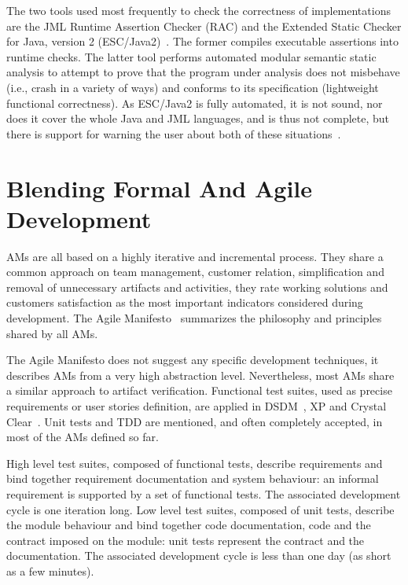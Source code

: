 \documentclass{article}
\begin{document}
The two tools used most frequently to check the correctness of implementations are the JML Runtime Assertion Checker (RAC) and the
Extended Static Checker for Java, version 2 (ESC/Java2)~\cite{Cheon-Leavens02b,BurdyEtal05-STTT,KiniryCok04}.  
The former compiles executable assertions into runtime checks.  
The latter tool performs automated modular semantic static analysis to attempt to prove that the program under analysis does not misbehave (i.e., crash in a variety of ways) and conforms to its specification (lightweight functional correctness).  
As ESC/Java2 is fully automated, it is not sound, nor does it cover the whole Java and JML languages, and is thus not complete, but there is support for warning the user about both of these situations~\cite{KiniryEtal06}.



\section{Blending Formal And Agile Development}
\label{sec:blending_formal_and_agile_development}

AMs are all based on a highly iterative and incremental process.
They share a common approach on team management, customer relation, simplification and removal of unnecessary artifacts and activities, they rate working solutions and customers satisfaction as the most important indicators considered during development.
The Agile Manifesto~\cite{Beck2001} summarizes the philosophy and principles shared by all AMs.

The Agile Manifesto does not suggest any specific development techniques, it describes AMs from a very high abstraction level.
Nevertheless, most AMs share a similar approach to artifact verification.
Functional test suites, used as precise requirements or user stories definition, are applied in DSDM~\cite{Stapleton1997}, XP and Crystal Clear~\cite{Cockburn2004}. 
Unit tests and TDD are mentioned, and often completely accepted, in most of the AMs defined so far.

High level test suites, composed of functional tests, describe requirements and bind together requirement documentation and system behaviour: an informal requirement is supported by a set of functional tests. 
The associated development cycle is one iteration long. 
Low level test suites, composed of unit tests, describe the module behaviour and bind together code documentation, code and the contract imposed on the module: unit tests represent the contract and the documentation. 
The associated development cycle is less than one day (as short as a few minutes).
\end{document}
